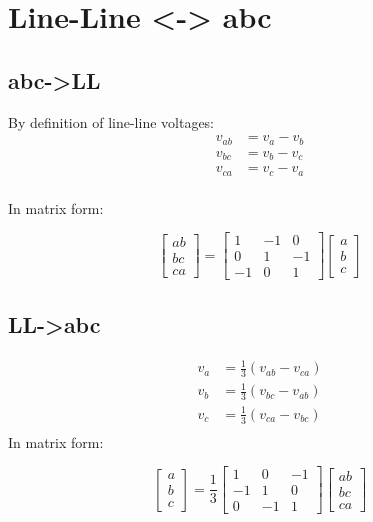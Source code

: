 \documentclass[]{book}
\begin{document}
\hypertarget{line-line---abc}{%
\section{Line-Line \textless{}-\textgreater{} abc}\label{line-line---abc}}

\hypertarget{abc-ll}{%
\subsection{abc-\textgreater{}LL}\label{abc-ll}}

By definition of line-line voltages:
\[
\begin{aligned}
v_{ab} &=  v_a - v_b \\
v_{bc} &=  v_b - v_c  \\
v_{ca} &=  v_c - v_a \\
\end{aligned}
\label{eq:abc2LL}
\]

In matrix form:

\[
\begin{bmatrix} ab\\ bc \\ ca \end{bmatrix}
= \begin{bmatrix} 1 & -1 & 0 \\  0 & 1&-1 \\ 
-1&0&1 \end{bmatrix}
\begin{bmatrix} a\\ b \\c \end{bmatrix}
\label{eq:abc2LLmat}
\]

\hypertarget{ll-abc}{%
\subsection{LL-\textgreater{}abc}\label{ll-abc}}

\[
\begin{aligned}
v_{a} &=  \frac{1}{3}\left( v_{ab} - v_{ca} \right)\\
v_{b} &=  \frac{1}{3}\left( v_{bc} - v_{ab} \right)  \\
v_{c} &=  \frac{1}{3}\left( v_{ca} - v_{bc} \right) \\
\end{aligned}
\label{eq:LL2abc}
\]
In matrix form:

\[
\begin{bmatrix} a\\ b \\c \end{bmatrix}
= \frac{1}{3} \begin{bmatrix} 1 & 0 & -1 \\  -1 & 1&0 \\ 
0&-1&1 \end{bmatrix}
\begin{bmatrix} ab\\ bc \\ ca \end{bmatrix}
\label{eq:abc2LLmat}
\]
\end{document}
